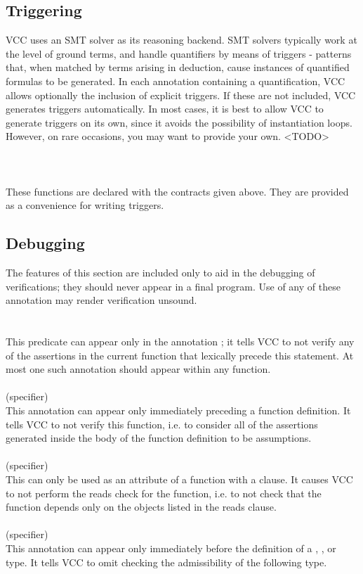 \documentclass[preprint,nocopyrightspace]{sigplanconf}
\begin{document}
{{{{\begin{VCC}
\subsection{Triggering}
VCC uses an SMT solver as its reasoning backend. SMT solvers typically
work at the level of ground terms, and handle quantifiers by means of
triggers - patterns that, when matched by terms arising in deduction,
cause instances of quantified formulas to be generated. In each
annotation containing a quantification, VCC allows optionally the
inclusion of explicit triggers. If these are not included, VCC
generates triggers automatically. In most cases, it is best to allow
VCC to generate triggers on its own, since it avoids the possibility
of instantiation loops. However, on rare occasions, you may want to
provide your own. <TODO>
\\\\
\\
\\
These functions are declared with the contracts given above. They are provided as a
convenience for writing triggers. 

\subsection{Debugging}
The features of this section are included only to aid in the debugging
of verifications; they should never appear in a final program. Use of
any of these annotation may render verification unsound.
\\\\
\\
This predicate can appear only in the
annotation ; it tells VCC to not verify
any of the assertions in the current function that lexically precede
this statement. At most one such annotation should appear within any
function. 
\\\\
 (specifier)\\
This annotation can appear only immediately preceding a function
definition. It tells VCC to not verify this function, i.e. to consider
all of the assertions generated inside the body of the function
definition to be assumptions.
\\\\
 (specifier)\\
This  can only be used as an attribute of a  function
with a  clause. It causes VCC to not perform the reads
check for the function, i.e. to not check that the function depends
only on the objects listed in the reads clause.
\\\\
 (specifier)\\
This annotation can appear only immediately before the definition of
a , , or  type. It tells VCC to
omit checking the admissibility of the following type.


\end{VCC}}}}}
\end{document}

